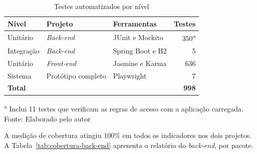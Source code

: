 \begin{table}[H]
\centering
\renewcommand{\arraystretch}{1.4}
\caption{Testes automatizados por nível}
\label{tab:testes-automatizados}
    \begin{tabular}{|l|l|l|r|}
    \hline
    \textbf{Nível} & \textbf{Projeto} & \textbf{Ferramentas} & \textbf{Testes} \\
    \hline
    Unitário & \textit{Back-end} & JUnit e Mockito & 350\textsuperscript{a} \\
    \hline
    Integração & \textit{Back-end} & Spring Boot e H2 & 5 \\
    \hline
    Unitário & \textit{Front-end} & Jasmine e Karma & 636 \\
    \hline
    Sistema & Protótipo completo & Playwright & 7 \\
    \hline
    \multicolumn{3}{|l|}{\textbf{Total}} & \textbf{998} \\
    \hline
    \end{tabular}
\begin{center}
    {\small \textsuperscript{a} Inclui 11 testes que verificam as regras de acesso com a aplicação carregada.}\\
    {\small Fonte: Elaborado pelo autor}
\end{center}
\end{table}

A medição de cobertura atingiu 100\% em todos os indicadores nos dois projetos. A Tabela~\ref{tab:cobertura-back-end} apresenta o relatório do \textit{back-end}, por pacote.

